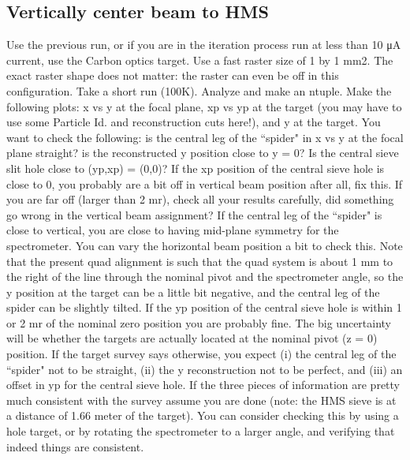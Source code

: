 \documentclass[]{article}
\begin{document}
	
\subsection{Vertically center beam to HMS}

Use the previous run, or if you are in the iteration process run at less than 10 μA current, use the Carbon optics target. Use a fast raster size of 1 by 1 mm2. The exact raster shape does not matter: the raster can even be off in this configuration. Take a short run (100K). Analyze and make an ntuple. Make the following plots: x vs y at the focal plane, xp vs yp at the target (you may have to use some Particle Id. and reconstruction cuts here!), and y at the target. You want to check the following: is the central leg of the ``spider" in x vs y at the focal plane straight? is the reconstructed y position close to y = 0? Is the central sieve slit hole close to (yp,xp) = (0,0)? If the xp position of the central sieve hole is close to 0, you probably are a bit off in vertical beam position after all, fix this. If you are far off (larger than 2 mr), check all your results carefully, did something go wrong in the vertical beam assignment? If the central leg of the ``spider" is close to vertical, you are close to having mid-plane symmetry for the spectrometer. You can vary the horizontal beam position a bit to check this. Note that the present quad alignment is such that the quad system is about 1 mm to the right of the line through the nominal pivot and the spectrometer angle, so the y position at the target can be a little bit negative, and the central leg of the spider can be slightly tilted. If the yp position of the central sieve hole is within 1 or 2 mr of the nominal zero position you are probably fine. The big uncertainty will be whether the targets are actually located at the nominal pivot (z = 0) position. If the target survey says otherwise, you expect (i) the central leg of the ``spider" not to be straight, (ii) the y reconstruction not to be perfect, and (iii) an offset in yp for the central sieve hole. If the three pieces of information are pretty much consistent with the survey assume you are done (note: the HMS sieve is at a distance of 1.66 meter of the target). You can consider checking this by using a hole target, or by rotating the spectrometer to a larger angle, and verifying that indeed things are consistent.
\end{document}
